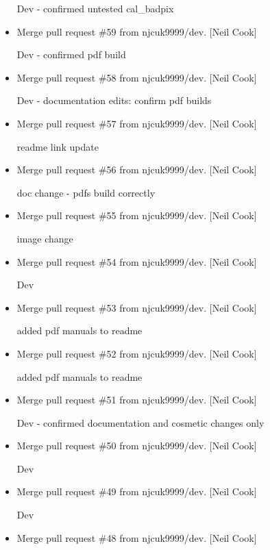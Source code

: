 \documentclass[a4paper,10pt,english]{report}
\begin{document}
\begin{itemize}
Dev - confirmed untested cal\_badpix

\item {} 
Merge pull request \#59 from njcuk9999/dev. {[}Neil Cook{]}

Dev - confirmed pdf build

\item {} 
Merge pull request \#58 from njcuk9999/dev. {[}Neil Cook{]}

Dev - documentation edits: confirm pdf builds

\item {} 
Merge pull request \#57 from njcuk9999/dev. {[}Neil Cook{]}

readme link update

\item {} 
Merge pull request \#56 from njcuk9999/dev. {[}Neil Cook{]}

doc change - pdfs build correctly

\item {} 
Merge pull request \#55 from njcuk9999/dev. {[}Neil Cook{]}

image change

\item {} 
Merge pull request \#54 from njcuk9999/dev. {[}Neil Cook{]}

Dev

\item {} 
Merge pull request \#53 from njcuk9999/dev. {[}Neil Cook{]}

added pdf manuals to readme

\item {} 
Merge pull request \#52 from njcuk9999/dev. {[}Neil Cook{]}

added pdf manuals to readme

\item {} 
Merge pull request \#51 from njcuk9999/dev. {[}Neil Cook{]}

Dev - confirmed documentation and cosmetic changes only

\item {} 
Merge pull request \#50 from njcuk9999/dev. {[}Neil Cook{]}

Dev

\item {} 
Merge pull request \#49 from njcuk9999/dev. {[}Neil Cook{]}

Dev

\item {} 
Merge pull request \#48 from njcuk9999/dev. {[}Neil Cook{]}


\end{itemize}
\end{document}
